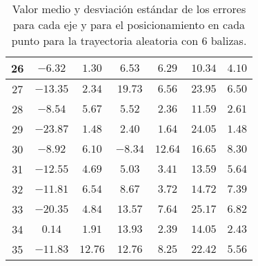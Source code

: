 \begin{table}[H]
\begin{tabular}{|c|c|c|c|c|c|c|}
                        26   &  $-6.32$    &  $1.30$   &  $6.53$    &  $6.29$  &  $10.34$ &  $4.10$   \\ \hline
                        27   &  $-13.35$   &  $2.34$   &  $19.73$   &  $6.56$  &  $23.95$ &  $6.50$   \\ \hline
                        28   &  $-8.54$    &  $5.67$   &  $5.52$    &  $2.36$  &  $11.59$ &  $2.61$   \\ \hline
                        29   &  $-23.87$   &  $1.48$   &  $2.40$    &  $1.64$  &  $24.05$ &  $1.48$   \\ \hline
                        30   &  $-8.92$    &  $6.10$   &  $-8.34$   &  $12.64$ &  $16.65$ &  $8.30$   \\ \hline
                        31   &  $-12.55$   &  $4.69$   &  $5.03$    &  $3.41$  &  $13.59$ &  $5.64$   \\ \hline
                        32   &  $-11.81$   &  $6.54$   &  $8.67$    &  $3.72$  &  $14.72$ &  $7.39$   \\ \hline
                        33   &  $-20.35$   &  $4.84$   &  $13.57$   &  $7.64$  &  $25.17$ &  $6.82$   \\ \hline
                        34   &  $0.14$     &  $1.91$   &  $13.93$   &  $2.39$  &  $14.05$ &  $2.43$   \\ \hline
                        35   &  $-11.83$   &  $12.76$  &  $12.76$   &  $8.25$  &  $22.42$ &  $5.56$   \\ \hline
        \end{tabular}
    \caption{Valor medio y desviación estándar de los errores para cada eje y para el posicionamiento en cada punto para la trayectoria aleatoria con 6 balizas.}
    \label{tab:media_lab_6_aleatoria}
\end{table}


